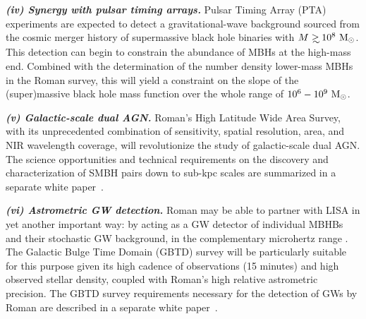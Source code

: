 \documentclass[tightenlines,superscriptaddress,amsmath,amssymb,prl,12pt]{revtex4-1}
\newcommand{\msun}{{\rm M}_\odot}
\newcommand\gsim{\mathrel{\rlap{\lower4pt\hbox{\hskip1pt$\sim$}}
        \raise1pt\hbox{$>$}}}
\begin{document}
\textbf{\it (iv) Synergy with pulsar timing arrays.}  Pulsar Timing
Array (PTA) experiments are expected to detect a gravitational-wave
background sourced from the cosmic merger history of supermassive
black hole binaries with $M\gsim 10^8~\msun$. This detection can begin
to constrain the abundance of MBHs at the high-mass end. Combined with
the determination of the number density lower-mass MBHs in the Roman
survey, this will yield a constraint on the slope of the
(super)massive black hole mass function over the whole range of
$10^6-10^9~\msun$.

\textbf{\it (v) Galactic-scale dual AGN.}  Roman's High Latitude Wide
Area Survey, with its unprecedented combination of sensitivity,
spatial resolution, area, and NIR wavelength coverage, will
revolutionize the study of galactic-scale dual AGN.  The science
opportunities and technical requirements on the discovery and
characterization of SMBH pairs down to sub-kpc scales are summarized
in a separate white paper~\cite{Roman-WP-Shen}.

\textbf{\it (vi) Astrometric GW detection.} Roman may be able to
partner with LISA in yet another important way: by acting as a GW
detector of individual MBHBs and their stochastic GW background, in
the complementary microhertz range
\cite{2021PhRvD.103h4007W,2022PhRvD.106h4006W}. The Galactic Bulge
Time Domain (GBTD) survey will be particularly suitable for this
purpose given its high cadence of observations (15 minutes) and high
observed stellar density, coupled with Roman's high relative
astrometric precision. The GBTD survey requirements necessary for the
detection of GWs by Roman are described in a separate white
paper~\cite{Roman-WP-Pardo}.
\end{document}
